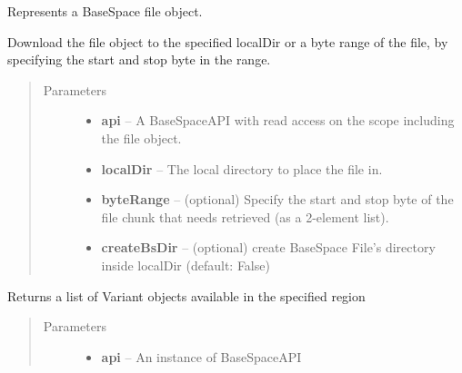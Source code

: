 \documentclass[letterpaper,10pt,english]{sphinxmanual}
\begin{document}
\begin{fulllineitems}
\label{Available modules:BaseSpacePy.model.File.File}
Represents a BaseSpace file object.

\begin{fulllineitems}
\label{Available modules:BaseSpacePy.model.File.File.downloadFile}
Download the file object to the specified localDir or a byte range of the file, by specifying the 
start and stop byte in the range.
\begin{quote}\begin{description}
\item[{Parameters}] \leavevmode\begin{itemize}
\item {} 
\textbf{api} -- A BaseSpaceAPI with read access on the scope including the file object.

\item {} 
\textbf{localDir} -- The local directory to place the file in.

\item {} 
\textbf{byteRange} -- (optional) Specify the start and stop byte of the file chunk that needs retrieved (as a 2-element list).

\item {} 
\textbf{createBsDir} -- (optional) create BaseSpace File's directory inside localDir (default: False)

\end{itemize}

\end{description}\end{quote}

\end{fulllineitems}


\begin{fulllineitems}
\label{Available modules:BaseSpacePy.model.File.File.filterVariant}
Returns a list of Variant objects available in the specified region
\begin{quote}\begin{description}
\item[{Parameters}] \leavevmode\begin{itemize}
\item {} 
\textbf{api} -- An instance of BaseSpaceAPI


\end{itemize}
\end{description}
\end{quote}
\end{fulllineitems}
\end{fulllineitems}
\end{document}
